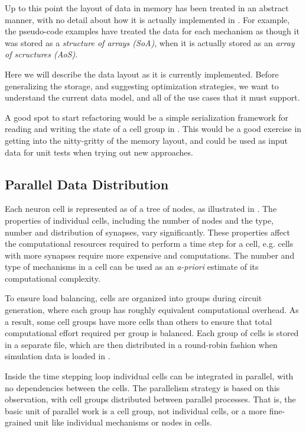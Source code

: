 Up to this point the layout of data in memory has been treated in an abstract manner, with no detail about how it is actually implemented in \neuron.
For example, the pseudo-code examples have treated the data for each mechanism as though it was stored as a \emph{structure of arrays (SoA)}, when it is actually stored as an \emph{array of scructures (AoS)}.

Here we will describe the data layout as it is currently implemented. Before generalizing the storage, and suggesting optimization strategies, we want to understand the current data model, and all of the use cases that it must support.

\begin{note}
A good spot to start refactoring would be a simple serialization framework for reading and writing the state of a cell group in \neuron. This would be a good exercise in getting into the nitty-gritty of the memory layout, and could be used as input data for unit tests when trying out new approaches.
\end{note}

\subsection{Parallel Data Distribution}
Each neuron cell is represented as of a tree of nodes, as illustrated in .
The properties of individual cells, including the number of nodes and the type, number and distribution of synapses, vary significantly.
These properties affect the computational resources required to perform a time step for a cell, e.g. cells with more synapses require more expensive  and  computations.
The number and type of mechanisms in a cell can be used as an \textit{a-priori} estimate of its computational complexity.

To ensure load balancing, cells are organized into groups during circuit generation, where each group has roughly equivalent computational overhead.
As a result, some cell groups have more cells than others to ensure that total computational effort required per group is balanced.
Each group of cells is stored in a separate  file, which are then distributed in a round-robin fashion when simulation data is loaded in .

Inside the time stepping loop individual cells can be integrated in parallel, with no dependencies between the cells.
The parallelism strategy is based on this observation, with cell groups distributed between parallel processes.
That is, the basic unit of parallel work is a cell group, not individual cells, or a more fine-grained unit like individual mechanisms or nodes in cells.

